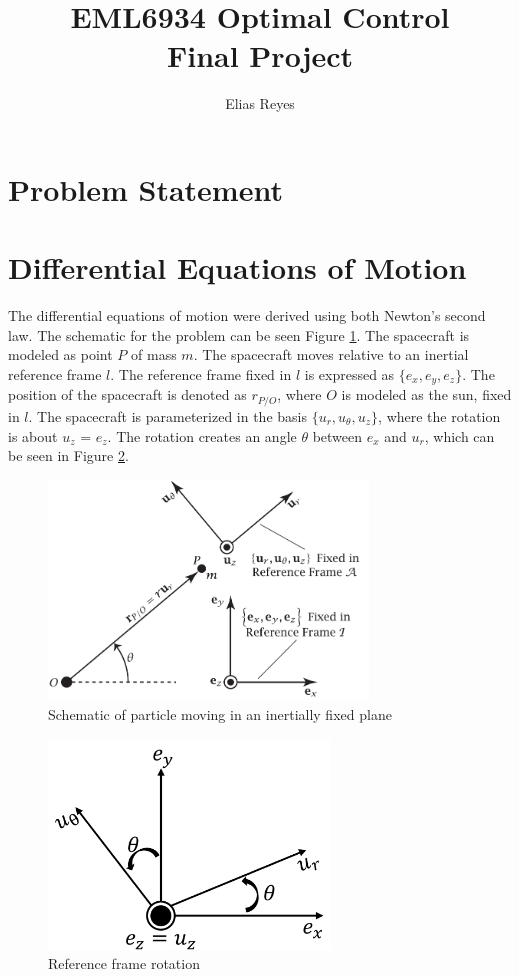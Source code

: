 \documentclass[]{article}
\title{EML6934 Optimal Control \\ Final Project}
\author{Elias Reyes}
\begin{document}
	
	\maketitle
	\thispagestyle{empty}
	\newpage
	\newpage
	\tableofcontents
	\newpage
	\listoffigures
	\listoftables
	\newpage
	\lstlistoflistings
	\newpage
	
	\section{Problem Statement}
	\section{Differential Equations of Motion}
	The differential equations of motion were derived using both Newton's second law. The schematic for the problem can be seen Figure \ref{fig:schematic}. The spacecraft is modeled as point \(P\) of  mass \(m\). The spacecraft moves relative to an inertial reference frame \(l\). The reference frame fixed in \(l\) is expressed as \(\{e_{x},e_{y},e_{z}\}\). The position of the spacecraft is denoted as \(r_{P/O}\), where \(O\) is modeled as the sun, fixed in \(l\). The spacecraft is parameterized in the basis \(\{u_{r},u_{\theta},u_{z}\}\), where the rotation is about \(u_{z}\) = \(e_{z}\). The rotation creates an angle \(\theta\) between \(e_{x}\) and \(u_{r}\), which can be seen in Figure \ref{fig:rotation2}.
	\begin{figure}
		\centering
		\includegraphics[width=85mm,scale=0.85]{midterm_schematic.png}
		\caption{Schematic of particle moving in an inertially fixed plane}
		\label{fig:schematic}
	\end{figure}
	\begin{figure}
		\centering
		\includegraphics[width=75mm,scale=0.75]{rotation.png}
		\caption{Reference frame rotation}
		\label{fig:rotation2}
	\end{figure}
\end{document}
